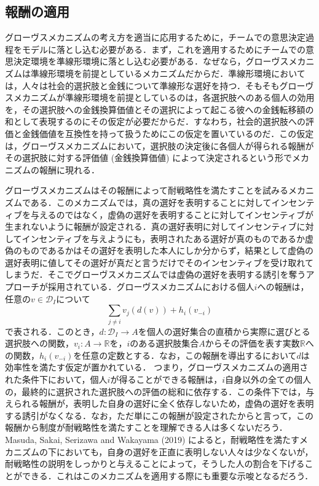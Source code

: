 \documentclass[a4paper, 11pt]{jsarticle}
\begin{document}
\subsection{報酬の適用}
グローヴスメカニズムの考え方を適当に応用するために，チームでの意思決定過程をモデルに落とし込む必要がある．まず，これを適用するためにチームでの意思決定環境を準線形環境に落とし込む必要がある．なぜなら，グローヴスメカニズムは準線形環境を前提としているメカニズムだからだ．準線形環境においては，人々は社会的選択肢と金銭について準線形な選好を持つ．そもそもグローヴスメカニズムが準線形環境を前提としているのは，各選択肢へのある個人の効用を，その選択肢への金銭換算価値とその選択によって起こる彼への金銭転移額の和として表現するのにその仮定が必要だからだ．すなわち，社会的選択肢への評価と金銭価値を互換性を持って扱うためにこの仮定を置いているのだ．この仮定は，グローヴスメカニズムにおいて，選択肢の決定後に各個人が得られる報酬がその選択肢に対する評価値 (金銭換算価値) によって決定されるという形でメカニズムの報酬に現れる．

グローヴスメカニズムはその報酬によって耐戦略性を満たすことを試みるメカニズムである．このメカニズムでは，真の選好を表明することに対してインセンティブを与えるのではなく，虚偽の選好を表明することに対してインセンティブが生まれないように報酬が設定される．真の選好表明に対してインセンティブに対してインセンティブを与えようにも，表明されたある選好が真のものであるか虚偽のものであるかはその選好を表明した本人にしか分からず，結果として虚偽の選好表明に値してその選好が真だと言うだけでそのインセンティブを受け取れてしまうだ．そこでグローヴスメカニズムでは虚偽の選好を表明する誘引を奪うアプローチが採用されている．グローヴスメカニズムにおける個人\(i\)への報酬は，任意の\(v \in \mathscr{D}_I\)について
\[\sum_{j \neq i}v_j(d(v)) + h_i(v_{-i})\]
で表される．このとき，\(d: \mathscr{D}_I \rightarrow A\)を個人の選好集合の直積から実際に選びとる選択肢への関数，\(v_i : A \rightarrow \mathbb{R}\)を，\(i\)のある選択肢集合\(A\)からその評価を表す実数\(\mathbb{R}\)への関数，\(h_i(v_{-i})\)を任意の定数とする．なお，この報酬を導出するにおいて\(d\)は効率性を満たす仮定が置かれている．
つまり，グローヴスメカニズムの適用された条件下において，個人\(i\)が得ることができる報酬は，\(i\)自身以外の全ての個人の，最終的に選択された選択肢への評価の総和に依存する．この条件下では，与えられる報酬が，表明した自身の選好に全く依存しないため，虚偽の選好を表明する誘引がなくなる．なお，ただ単にこの報酬が設定されたからと言って，この報酬から制度が耐戦略性を満たすことを理解できる人は多くないだろう．Masuda, Sakai, Serizawa and Wakayama (2019) \cite{Sakai2019}によると，耐戦略性を満たすメカニズムの下においても，自身の選好を正直に表明しない人々は少なくないが，耐戦略性の説明をしっかりと与えることによって，そうした人の割合を下げることができる．これはこのメカニズムを適用する際にも重要な示唆となるだろう．
\end{document}
